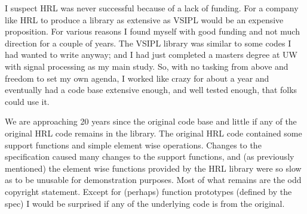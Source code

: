 I suspect HRL was never successful because of a lack of funding. For a company like HRL to produce a library as extensive as VSIPL would be an expensive proposition. For various reasons I found myself with good funding and not much direction for a couple of years. The VSIPL library was similar to some codes I had wanted to write anyway; and I had just completed a masters degree at UW with signal processing as my main study. So, with no tasking from above and freedom to set my own agenda, I worked like crazy for about a year and eventually had a code base extensive enough, and well tested enough, that folks could use it.

We are approaching 20 years since the original code base and little if any of the original HRL code remains in the library.  The original HRL code contained some support functions and simple element wise operations. Changes to the specification caused many changes to the support functions, and (as previously mentioned) the element wise functions provided by the HRL library were so slow as to be unusable for demonstration purposes. Most of what remains are the odd copyright statement. Except for (perhaps) function prototypes (defined by the spec) I would be surprised if any of the underlying code is from the original.

